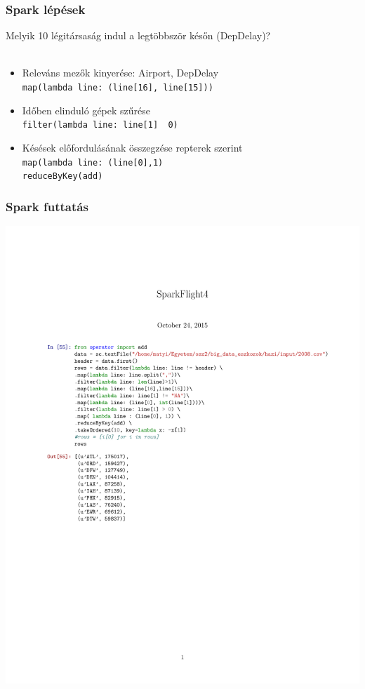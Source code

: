 \documentclass{beamer}
\begin{document}
\begin{frame}
\frametitle{Spark lépések}
Melyik 10 légitársaság indul a legtöbbször későn (DepDelay)? \\~\\
\begin{itemize}
\item Releváns mezők kinyerése: Airport, DepDelay \\
	\qquad \lstinline[basicstyle=\ttfamily\color{black}]|map(lambda line: (line[16], line[15]))|\\
\item Időben elinduló gépek szűrése\\
	\qquad \lstinline[basicstyle=\ttfamily\color{black}]|filter(lambda line: line[1]  0)|\\
\item Késések előfordulásának összegzése repterek szerint\\
	\qquad \lstinline[basicstyle=\ttfamily\color{black}]|map(lambda line: (line[0],1)|\\
	\qquad \lstinline[basicstyle=\ttfamily\color{black}]|reduceByKey(add)|
\end{itemize}
\end{frame}


\begin{frame}
\frametitle{Spark futtatás}
\includegraphics[scale=0.7,clip,trim=5mm 5mm 10mm 7cm]{figures/SparkFlight4.pdf}
\end{frame}
\end{document}
